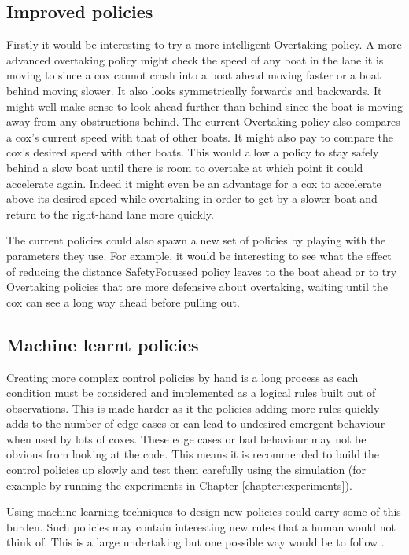 \subsection{Improved policies}
Firstly it would be interesting to try a more intelligent Overtaking policy. A more advanced overtaking policy might check the speed of any boat in the lane it is moving to since a cox cannot crash into a boat ahead moving faster or a boat behind moving slower. It also looks symmetrically forwards and backwards. It might well make sense to look ahead further than behind since the boat is moving away from any obstructions behind. The current Overtaking policy also compares a cox's current speed with that of other boats. It might also pay to compare the cox's desired speed with other boats. This would allow a policy to stay safely behind a slow boat until there is room to overtake at which point it could accelerate again. Indeed it might even be an advantage for a cox to accelerate above its desired speed while overtaking in order to get by a slower boat and return to the right-hand lane more quickly.

The current policies could also spawn a new set of policies by playing with the parameters they use. For example, it would be interesting to see what the effect of reducing the distance SafetyFocussed policy leaves to the boat ahead or to try Overtaking policies that are more defensive about overtaking, waiting until the cox can see a long way ahead before pulling out.

\subsection{Machine learnt policies}\label{control:future:machinelearnt}
Creating more complex control policies by hand is a long process as each condition must be considered and implemented as a logical rules built out of observations. This is made harder as it the policies adding more rules quickly adds to the number of edge cases or can lead to undesired emergent behaviour when used by lots of coxes. These edge cases or bad behaviour may not be obvious from looking at the code. This means it is recommended to build the control policies up slowly and test them carefully using the simulation (for example by running the experiments in Chapter \ref{chapter:experiments}).

Using machine learning techniques to design new policies could carry some of this burden. Such policies may contain interesting new rules that a human would not think of. This is a large undertaking but one possible way would be to follow \textcite{Kochenderfer2003}. 

